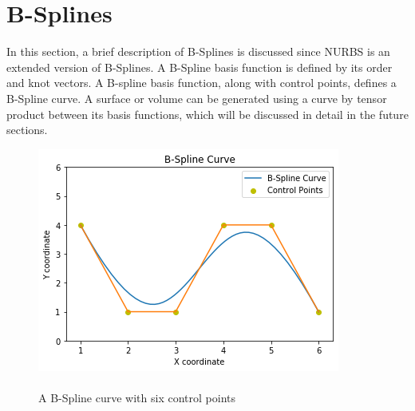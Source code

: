 \documentclass[11pt]{article}
\begin{document}
\newpage

\section{B-Splines } \label{B_Spline}
In this section, a brief description of B-Splines is discussed since NURBS is an extended version of B-Splines. A B-Spline basis function is defined by its order and knot vectors. A B-spline basis function, along with control points, defines a B-Spline curve. A surface or volume can be generated using a curve by tensor product between its basis functions, which will be discussed in detail in the future sections.
\begin{figure}[H]
	\begin{center}
		\includegraphics[scale=0.8]{B_Spline.png} 
		\caption{\\A B-Spline curve with six control points}\label{B_Spline}
	\end{center}	
\end{figure}
\end{document}
